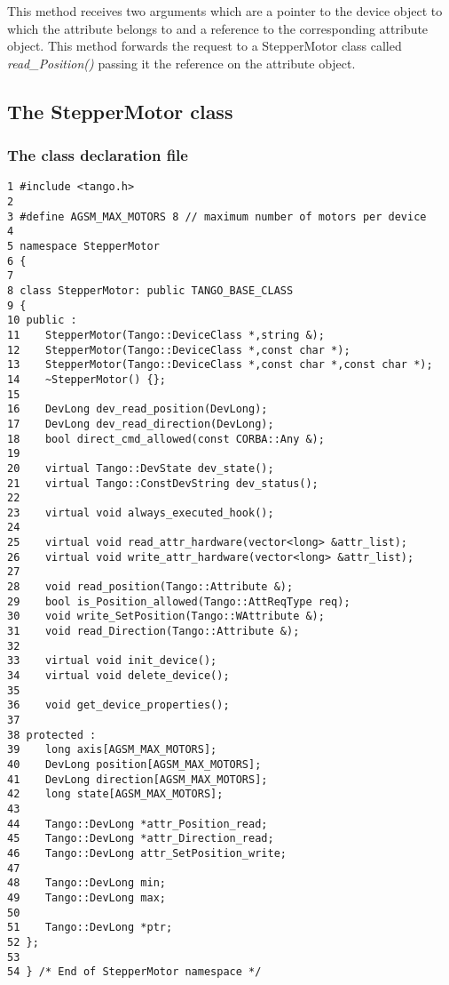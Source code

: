 This method receives two arguments which are a pointer to the device
object to which the attribute belongs to and a reference to the corresponding
attribute object. This method \textquotedbl{}forwards\textquotedbl{}
the request to a StepperMotor class called \emph{read\_Position()}
passing it the reference on the attribute object.




\subsection{The StepperMotor class}


\subsubsection{The class declaration file}


\begin{verbatim}
1 #include <tango.h>
2 
3 #define AGSM_MAX_MOTORS 8 // maximum number of motors per device
4 
5 namespace StepperMotor
6 {
7 
8 class StepperMotor: public TANGO_BASE_CLASS
9 {
10 public :
11    StepperMotor(Tango::DeviceClass *,string &);
12    StepperMotor(Tango::DeviceClass *,const char *);
13    StepperMotor(Tango::DeviceClass *,const char *,const char *);
14    ~StepperMotor() {};
15 
16    DevLong dev_read_position(DevLong);
17    DevLong dev_read_direction(DevLong);
18    bool direct_cmd_allowed(const CORBA::Any &);
19 
20    virtual Tango::DevState dev_state();
21    virtual Tango::ConstDevString dev_status();
22 
23    virtual void always_executed_hook();
24 
25    virtual void read_attr_hardware(vector<long> &attr_list);
26    virtual void write_attr_hardware(vector<long> &attr_list);
27 
28    void read_position(Tango::Attribute &);
29    bool is_Position_allowed(Tango::AttReqType req);
30    void write_SetPosition(Tango::WAttribute &);
31    void read_Direction(Tango::Attribute &);
32 
33    virtual void init_device();
34    virtual void delete_device();
35 
36    void get_device_properties();
37 
38 protected : 
39    long axis[AGSM_MAX_MOTORS];
40    DevLong position[AGSM_MAX_MOTORS];
41    DevLong direction[AGSM_MAX_MOTORS];
42    long state[AGSM_MAX_MOTORS];
43 
44    Tango::DevLong *attr_Position_read;
45    Tango::DevLong *attr_Direction_read;
46    Tango::DevLong attr_SetPosition_write;
47 
48    Tango::DevLong min;
49    Tango::DevLong max;
50 
51    Tango::DevLong *ptr;
52 };
53 
54 } /* End of StepperMotor namespace */
\end{verbatim}




